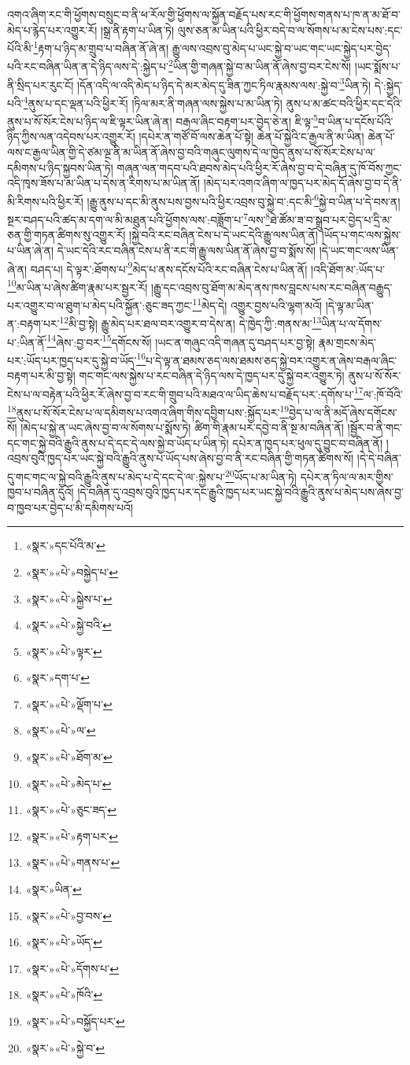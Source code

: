 འགའ་ཞིག་རང་གི་ཕྱོགས་བསྲུང་བ་ནི་ཕ་རོལ་གྱི་ཕྱོགས་ལ་སྐྱོན་བརྗོད་པས་རང་གི་ཕྱོགས་གནས་པ་ཁ་ན་མ་ཐོ་བ་མེད་པ་རྙེད་པར་འགྱུར་རོ། །སྒྲ་ནི་རྟག་པ་ཡིན་ཏེ། ལུས་ཅན་མ་ཡིན་པའི་ཕྱིར་བདེ་བ་ལ་སོགས་པ་མ་ངེས་པས་:དང་པོའི་མི་\footnote{«སྣར་»དང་པོའི་མ་}རྟག་པ་ཉིད་མ་གྲུབ་པ་བཞིན་ནོ་ཞེ་ན། རྒྱུ་ལས་འབྲས་བུ་མེད་པ་ཡང་སྐྱེ་བ་ཡང་གང་ཡང་སྐྱེད་པར་བྱེད་པའི་རང་བཞིན་ཡིན་ན་དེ་ཉིད་ལས་དེ་:སྐྱེད་པ་\footnote{«སྣར་»«པེ་»བསྐྱེད་པ་}ཡིན་གྱི་གཞན་སྐྱེ་བ་མ་ཡིན་ནོ་ཞེས་བྱ་བར་ངེས་སོ། །ཡང་སྨོས་པ་ནི་སྲིད་པར་རུང་ངོ། །དོན་འདི་ལ་འདི་མེད་པ་ཉིད་དེ་མར་མེད་དུ་ཟིན་ཀྱང་ཏིལ་རྣམས་ལས་:སྐྱེ་བ་\footnote{«སྣར་»«པེ་»སྐྱེས་པ་}ཡིན་ཏེ། དེ་:སྐྱེད་པའི་\footnote{«སྣར་»«པེ་»སྐྱེ་བའི་}ནུས་པ་དང་ལྡན་པའི་ཕྱིར་རོ། །ཏིལ་མར་ནི་གཞན་ལས་སྐྱེས་པ་མ་ཡིན་ཏེ། ནུས་པ་མ་ཚང་བའི་ཕྱིར་དང་དེའི་ནུས་པ་སོ་སོར་ངེས་པ་ཉིད་ལ་ཇི་ལྟར་ཡིན་ཞེ་ན། བརྒལ་ཞིང་བརྟག་པར་བྱེད་ཅེ་ན། ཇི་ལྟ་\footnote{«སྣར་»«པེ་»ལྟར་}བ་ཡིན་པ་དངོས་པོའི་ཉིད་ཀྱིས་ལན་འདེབས་པར་འགྱུར་རོ། །དཔེར་ན་གཙོ་བོ་ལས་ཆེན་པོ་སྟེ། ཆེན་པོ་སྐྱེའི་ང་རྒྱལ་ནི་མ་ཡིན། ཆེན་པོ་ལས་ང་རྒྱལ་ཡིན་གྱི་དེ་ཙམ་ལྔ་ནི་མ་ཡིན་ནོ་ཞེས་བྱ་བའི་གཞུང་ལུགས་དེ་ལ་ཁྱེད་ནུས་པ་སོ་སོར་ངེས་པ་ལ་དམིགས་པ་ཉིད་སྐྱབས་ཡིན་ཏེ། གཞན་ལན་གདབ་པའི་ཐབས་མེད་པའི་ཕྱིར་རོ་ཞེས་བྱ་བ་དེ་བཞིན་དུ་ཁོ་བོས་ཀྱང་འདི་ཁྭས་ཟོས་པ་མ་ཡིན་པ་དེས་ན་རིགས་པ་མ་ཡིན་ནོ། །མེད་པར་འགའ་ཞིག་ལ་ཁྱད་པར་མེད་དོ་ཞེས་བྱ་བ་དེ་ནི་མི་རིགས་པའི་ཕྱིར་རོ། །རྒྱུ་ནུས་པ་དང་མི་ནུས་པས་བྱས་པའི་ཕྱིར་འབྲས་བུ་སྐྱེ་བ་:དང་མི་\footnote{«སྣར་»དག་པ་}སྐྱེ་བ་ཡིན་པ་དེ་བས་ན། སྔར་བཤད་པའི་ཚད་མ་དག་ལ་མི་མཐུན་པའི་ཕྱོགས་ལས་:བཟློག་པ་\footnote{«སྣར་»«པེ་»ལྡོག་པ་}ལས་\footnote{«སྣར་»«པེ་»ལ་}ཐེ་ཚོམ་ཟ་བ་སྒྲུབ་པར་བྱེད་པ་དྲི་མ་ཅན་གྱི་གཏན་ཚིགས་སུ་འགྱུར་རོ། །སྐྱེ་བའི་རང་བཞིན་ངེས་པ་དེ་ཡང་དེའི་རྒྱུ་ལས་ཡིན་ནོ། །ཡོད་པ་གང་ལས་སྐྱེས་པ་ཡིན་ཞེ་ན། དེ་ཡང་དེའི་རང་བཞིན་ངེས་པ་ནི་རང་གི་རྒྱུ་ལས་ཡིན་ནོ་ཞེས་བྱ་བ་སྨོས་སོ། །དེ་ཡང་གང་ལས་ཡིན་ཞེ་ན། བཤད་པ། དེ་ལྟར་:ཐོགས་པ་\footnote{«སྣར་»«པེ་»ཐོག་མ་}མེད་པ་ནས་དངོས་པོའི་རང་བཞིན་ངེས་པ་ཡིན་ནོ། །འདི་ཐོག་མ་:ཡོད་པ་\footnote{«སྣར་»«པེ་»མེད་པ་}མ་ཡིན་པ་ཞེས་ཚིག་རྣམ་པར་སྦྱར་རོ། །རྒྱུ་དང་འབྲས་བུ་ཐོག་མ་མེད་ནས་ཁས་བླངས་པས་རང་བཞིན་བརྒྱུད་པར་འགྱུར་བ་ལ་ཐུག་པ་མེད་པའི་སྐྱོན་:ཅུང་ཟད་ཀྱང་\footnote{«སྣར་»«པེ་»ཅུང་ཟད་}མེད་དེ། འགྱུར་བྱས་པའི་ལྷག་མའོ། །དེ་ལྟ་མ་ཡིན་ན་:བརྟག་པར་\footnote{«སྣར་»«པེ་»རྟག་པར་}མི་བྱ་སྟེ། རྒྱུ་མེད་པར་ཐལ་བར་འགྱུར་བ་དེས་ན། དེ་ཁྱེད་ཀྱི་:གནས་མ་\footnote{«སྣར་»«པེ་»གནས་པ་}ཡིན་པ་ལ་དོགས་པ་:ཡིན་ནོ་\footnote{«སྣར་»ཡིན་}ཞེས་:བྱ་བར་\footnote{«སྣར་»«པེ་»བྱ་བས་}དགོངས་སོ། །ཡང་ན་གཞུང་འདི་གཞན་དུ་བཤད་པར་བྱ་སྟེ། རྣམ་གྲངས་མེད་པར་:ཡོད་པར་ཁྱད་པར་དུ་སྐྱེ་བ་ཡོད་\footnote{«སྣར་»«པེ་»ཡོད་}པ་དེ་ལྟ་ན་ཐམས་ཅད་ལས་ཐམས་ཅད་སྐྱེ་བར་འགྱུར་ན་ཞེས་བརྒལ་ཞིང་བརྟག་པར་མི་བྱ་སྟེ། གང་གང་ལས་སྐྱེས་པ་རང་བཞིན་དེ་ཉིད་ལས་དེ་ཁྱད་པར་དུ་སྐྱེ་བར་འགྱུར་ཏེ། ནུས་པ་སོ་སོར་ངེས་པ་ལ་བརྟེན་པའི་ཕྱིར་རོ་ཞེས་བྱ་བ་རང་གི་གྲུབ་པའི་མཐའ་ལ་ཡིད་ཆེས་པ་བརྗོད་པར་:དགོས་པ་\footnote{«སྣར་»«པེ་»དོགས་པ་}ལ་:ཁོ་བོའི་\footnote{«སྣར་»«པེ་»ཁོའི་}ནུས་པ་སོ་སོར་ངེས་པ་ལ་དམིགས་པ་འགའ་ཞིག་གིས་དབྱིག་པས་:སྐྱོད་པར་\footnote{«སྣར་»«པེ་»བསྐྱོད་པར་}བྱེད་པ་ལ་ནི་མདོ་ཞེས་དགོངས་སོ། །མེད་པ་སྐྱེ་ན་ཡང་ཞེས་བྱ་བ་ལ་སོགས་པ་སྨོས་ཏེ། ཚིག་གི་རྣམ་པར་དབྱེ་བ་ནི་སྔ་མ་བཞིན་ནོ། །སྦྱོར་བ་ནི་གང་དང་གང་སྐྱེ་བའི་རྒྱུའི་ནུས་པ་དེ་དང་དེ་ལས་སྐྱེ་བ་ཡོད་པ་ཡིན་ཏེ། དཔེར་ན་ཁྱད་པར་ཕུལ་དུ་བྱུང་བ་བཞིན་ནོ། །འབྲས་བུའི་ཁྱད་པར་ཡང་སྐྱེ་བའི་རྒྱུའི་ནུས་པ་ཡོད་པས་ཞེས་བྱ་བ་ནི་རང་བཞིན་གྱི་གཏན་ཚིགས་སོ། །དེ་དེ་བཞིན་དུ་གང་གང་ལ་སྐྱེ་བའི་རྒྱུའི་ནུས་པ་མེད་པ་དེ་དང་དེ་ལ་:སྐྱེས་པ་\footnote{«སྣར་»«པེ་»སྐྱེ་བ་}ཡོད་པ་མ་ཡིན་ཏེ། དཔེར་ན་ཏིལ་ལ་མར་གྱིས་ཁྱབ་པ་བཞིན་དུའོ། །དེ་བཞིན་དུ་འབྲས་བུའི་ཁྱད་པར་དང་རྒྱུའི་ཁྱད་པར་ཡང་སྐྱེ་བའི་རྒྱུའི་ནུས་པ་མེད་པས་ཞེས་བྱ་བ་ཁྱབ་པར་བྱེད་པ་མི་དམིགས་པའོ། 